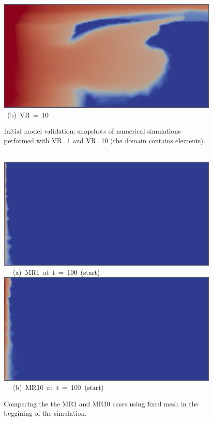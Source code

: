 \begin{landscape}
\begin{figure}[ht]
{{            \includegraphics[width=.55\textwidth]{./Pics1/mr10_fixed/mr10_fixed_middle_1.pdf} }
      \hbox{\hspace{10cm} (b) VR = 10  }}
\caption{Initial model validation: snapshots of numerical simulations performed with VR=1 and VR=10 (the domain contains  elements).}
\label{fem_cv_represent_a}
\end{figure}
\end{landscape}
\clearpage



\begin{figure}[ht] 
\vbox{
\hbox{\hspace{1.5cm}
\includegraphics[width=.85\textwidth]{./Pics1/mr1_fixed/mr1_fixed_100_2.pdf} 
}
\vspace{0.0cm}
\hbox{\hspace{4.0cm} (a) MR1 at t = 100 (start)   
}
\vspace{0.25cm}
\hbox{\hspace{1.5cm}
\includegraphics[width=.85\textwidth]{./Pics1/mr10_fixed/mr10_fixed_100_1.pdf}
}
\vspace{0.0cm}
\hbox{\hspace{4.0cm} (b) MR10 at t = 100 (start)  
}
}     
\caption{Comparing the the MR1 and MR10 cases using fixed mesh in the beggining of the simulation.}
\label{fig:6a}
\end{figure}
\clearpage

